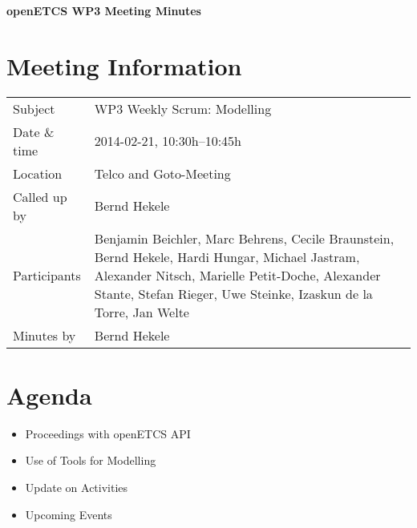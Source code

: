\documentclass[a4paper, 11pt]{article}
\begin{document}
{\begin{center}\huge\bf openETCS WP3 Meeting Minutes\end{center}}
\section{Meeting Information}

\renewcommand{\arraystretch}{1.5}
\begin{supertabular}{m{.2\textwidth}m{.8\textwidth}}
Subject & WP3 Weekly Scrum: Modelling\\
Date \& time & 2014-02-21, 10:30h--10:45h\\
Location & Telco and Goto-Meeting\\
Called up by & Bernd Hekele\\
Participants &
Benjamin Beichler,
Marc Behrens,
Cecile Braunstein,
Bernd Hekele,
Hardi Hungar,
Michael Jastram,
Alexander Nitsch,
Marielle Petit-Doche,
Alexander Stante,
Stefan Rieger,
Uwe Steinke,
Izaskun de la Torre,
Jan Welte
\\

Minutes by & Bernd Hekele\\
\end{supertabular}
\renewcommand{\arraystretch}{1.0}


\section{{Agenda}}
\begin{itemize}
\item Proceedings with openETCS API
\item Use of Tools for Modelling\\
\item Update on Activities\\
\item Upcoming Events\\
\end{itemize}
\end{document}
